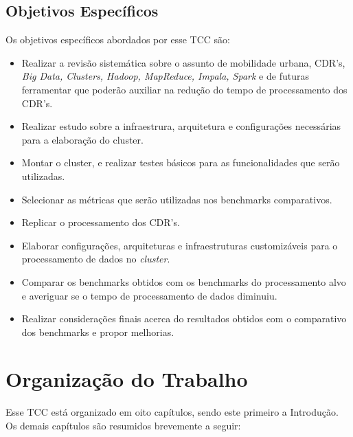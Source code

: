        \subsection{Objetivos Específicos}

            Os objetivos específicos abordados por esse TCC são:

            \begin{itemize}
                \item Realizar a revisão sistemática sobre o assunto de mobilidade urbana, CDR's, \textit{Big Data, Clusters, Hadoop,
                          MapReduce, Impala, Spark} e de futuras ferramentar que poderão auxiliar na redução do tempo de
                          processamento dos CDR's.
                \item Realizar estudo sobre a infraestrura, arquitetura e configurações necessárias para a elaboração do cluster.
                \item Montar o cluster, e realizar testes básicos para as funcionalidades que serão utilizadas.
                \item Selecionar as métricas que serão utilizadas nos benchmarks comparativos.
                \item Replicar o processamento dos CDR's.
                \item Elaborar configurações, arquiteturas e infraestruturas customizáveis para o processamento de dados no \textit{cluster}.
                \item Comparar os benchmarks obtidos com os benchmarks do processamento alvo e averiguar se o tempo
                          de processamento de dados diminuiu.
                \item Realizar considerações finais acerca do resultados obtidos com o comparativo dos benchmarks e propor melhorias.
            \end{itemize}

\section{Organização do Trabalho}

    Esse TCC está organizado em oito capítulos, sendo este primeiro a Introdução. Os
    demais capítulos são resumidos brevemente a seguir:

